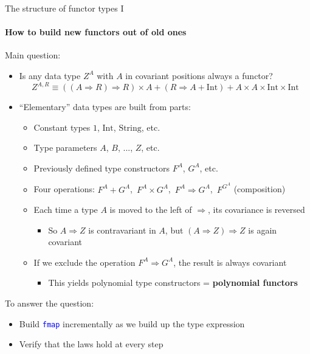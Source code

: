 \documentclass[english]{beamer}
\begin{document}
\begin{frame}{The structure of functor types I}

\framesubtitle{How to build new functors out of old ones}

Main question:
\begin{itemize}
\item Is any data type $Z^{A}$ with $A$ in covariant positions always
a functor? {\footnotesize{}
\[
Z^{A,R}\equiv\left(\left(A\Rightarrow R\right)\Rightarrow R\right)\times A+\left(R\Rightarrow A+\text{Int}\right)+A\times A\times\text{Int}\times\text{Int}
\]
}{\footnotesize \par}
\item ``Elementary'' data types are built from parts:
\begin{itemize}
\item Constant types $1$, $\text{Int}$, $\text{String}$, etc.
\item Type parameters $A$, $B$, ..., $Z$, etc.
\item Previously defined type constructors $F^{A}$, $G^{A}$, etc.
\item Four operations: $F^{A}+G^{A}$,\  $F^{A}\times G^{A}$,\  $F^{A}\Rightarrow G^{A}$,\ 
$F^{G^{A}}$ (composition)
\item Each time a type $A$ is moved to the left of $\Rightarrow$, its
covariance is reversed
\begin{itemize}
\item So $A\Rightarrow Z$ is contravariant in $A$, but $\left(A\Rightarrow Z\right)\Rightarrow Z$
is again covariant
\end{itemize}
\item If we exclude the operation $F^{A}\Rightarrow G^{A}$, the result
is always covariant
\begin{itemize}
\item This yields polynomial type constructors = \textbf{polynomial functors}
\end{itemize}
\end{itemize}
\end{itemize}
To answer the question:
\begin{itemize}
\item Build \texttt{\textcolor{blue}{\footnotesize{}fmap}} incrementally
as we build up the type expression
\item Verify that the laws hold at every step
\end{itemize}
\end{frame}
\end{document}
